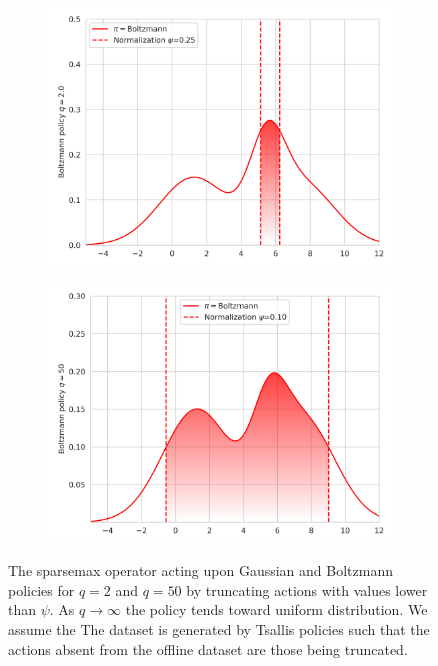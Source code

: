 \documentclass{article}
\begin{document}
\begin{figure}[t]
\begin{subfigure}[b]{0.245\textwidth}
        \includegraphics[width=\textwidth]{img/q2.0_Boltzmann_sparsemax.png}
    \end{subfigure}
    \begin{subfigure}[b]{0.245\textwidth}
        \includegraphics[width=\textwidth]{img/q50_Boltzmann_sparsemax.png}
    \end{subfigure}
    \caption{The sparsemax operator acting upon Gaussian and Boltzmann policies for $q=2$ and $q=50$ by truncating actions with values lower than $\psi$. 
    As $q\rightarrow \infty$ the policy tends toward uniform distribution.
    We assume the The dataset is generated by Tsallis policies such that the actions absent from the offline dataset are those being truncated.
    }
\end{figure}
\end{document}
